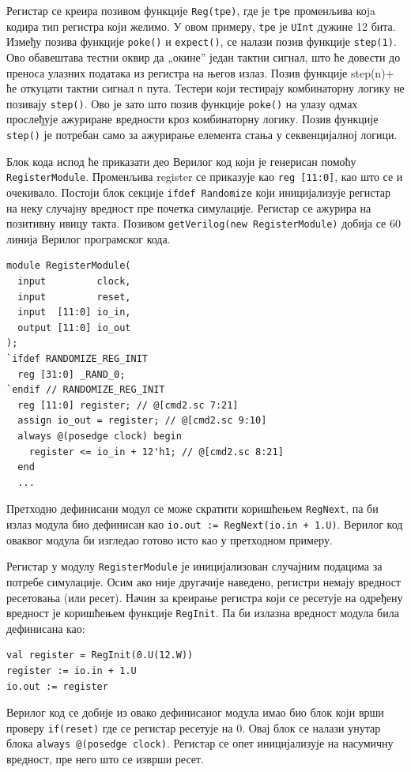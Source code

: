 \documentclass[12pt, a4paper]{article}
\theoremstyle{definition}
\begin{document}
Регистар се креира позивом функције \verb+Reg(tpe)+, где је \verb+tpe+ променљива коja кодира тип регистра који желимо. У овом примеру, \verb+tpe+ је \verb+UInt+ дужине 12 бита. Између позива функције \verb+poke()+ и \verb+expect()+, се налази позив функције \verb+step(1)+. Ово обавештава тестни оквир да „окине” један тактни сигнал, што ће довести до преноса улазних података из регистра на његов излаз. Позив функције step(n)+ ће откуцати тактни сигнал \verb+n+ пута.
Тестери који тестирају комбинаторну логику не позивају \verb+step()+. Ово је зато што позив функције \verb+poke()+ на улазу одмах прослеђује ажуриране вредности кроз комбинаторну логику. Позив функције \verb+step()+ је потребан само за ажурирање елемента стања у секвенцијалној логици.

Блок кода испод ће приказати део Верилог код који је генерисан помоћу \verb+RegisterModule+.
Променљива register се приказује као \verb+reg [11:0]+, као што се и очекивало.
Постоји блок секције \verb+ifdef Randomize+ који иницијализује регистар на неку случајну вредност пре почетка симулације.
Регистар се ажурира на позитивну ивицу такта. Позивом \verb+getVerilog(new RegisterModule)+ добија се 60 линија Верилог програмског кода.
\begin{verbatim}
module RegisterModule(
  input         clock,
  input         reset,
  input  [11:0] io_in,
  output [11:0] io_out
);
`ifdef RANDOMIZE_REG_INIT
  reg [31:0] _RAND_0;
`endif // RANDOMIZE_REG_INIT
  reg [11:0] register; // @[cmd2.sc 7:21]
  assign io_out = register; // @[cmd2.sc 9:10]
  always @(posedge clock) begin
    register <= io_in + 12'h1; // @[cmd2.sc 8:21]
  end
  ...
\end{verbatim}

Претходно дефинисани модул се може скратити коришћењем \verb+RegNext+, па би излаз модула био дефинисан као \verb-io.out := RegNext(io.in + 1.U)-. Верилог код оваквог модула би изгледао готово исто као у претходном примеру.

Регистар у модулу \verb+RegisterModule+ је иницијализован случајним подацима за потребе симулације. Осим ако није другачије наведено, регистри немају вредност ресетовања (или ресет). Начин за креирање регистра који се ресетује на одређену вредност је коришћењем функције \verb+RegInit+. Па би излазна вредност модула била дефинисана као:
\begin{verbatim}
val register = RegInit(0.U(12.W))
register := io.in + 1.U
io.out := register
\end{verbatim}
Верилог код се добије из овако дефинисаног модула имао био блок који врши проверу \verb+if(reset)+ где се регистар ресетује на 0. Овај блок се налази унутар блока \verb+always @(posedge clock)+. Регистар се опет иницијализује на насумичну вредност, пре него што се изврши ресет.
\end{document}
